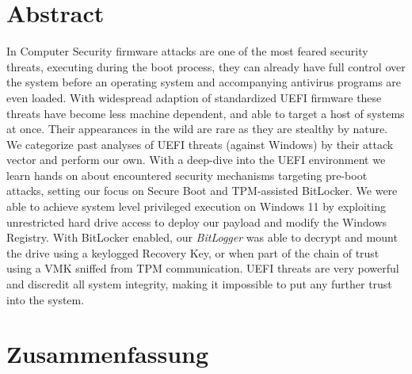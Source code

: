 

\chapter*{Abstract}
\label{sec:abstract}
\thispagestyle{empty}

In Computer Security firmware attacks are one of the most feared security threats, executing during the boot process, they can already have full control over the system before an operating system and accompanying antivirus programs are even loaded.
With widespread adaption of standardized \acs{UEFI} firmware these threats have become less machine dependent, and able to target a host of systems at once.
Their appearances in the wild are rare as they are stealthy by nature. We categorize past analyses of \acs{UEFI} threats (against Windows) by their attack vector and perform our own.
With a deep-dive into the \acs{UEFI} environment we learn hands on about encountered security mechanisms targeting pre-boot attacks, setting our focus on Secure Boot and \acs{TPM}-assisted BitLocker.
We were able to achieve system level privileged execution on Windows 11 by exploiting unrestricted hard drive access to deploy our payload and modify the Windows Registry. With BitLocker enabled, our \emph{BitLogger} was able to decrypt and mount the drive using a keylogged Recovery Key, or when part of the chain of trust using a \acs{VMK} sniffed from \acs{TPM} communication.
\acs{UEFI} threats are very powerful and discredit all system integrity, making it impossible to put any further trust into the system.

\acresetall

\chapter*{Zusammenfassung}
\thispagestyle{empty}
\label{sec:zusammenfassung}

\blindtext

\acresetall